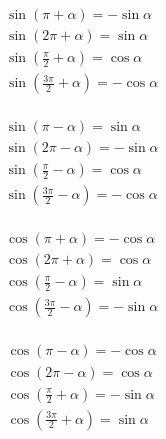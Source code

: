 \documentclass[a4paper, fleqn, fontset = mac]{ctexart}
\begin{document}
	\noindent
	\begin{minipage}{0.2\textwidth}
	\small
	\begin{align*}
		& \sin\left( \pi + \alpha \right) = -\sin\alpha \\
		& \sin\left( 2\pi + \alpha \right) = \sin\alpha \\
		& \sin\left( \frac\pi2 + \alpha \right) = \cos\alpha \\
		& \sin\left( \frac{3\pi}2 + \alpha \right) = -\cos\alpha \\
	\end{align*}
	
	\begin{align*}
		& \sin\left( \pi - \alpha \right) = \sin\alpha \\
		& \sin\left( 2\pi - \alpha \right) = -\sin\alpha \\
		& \sin\left( \frac\pi2 - \alpha \right) = \cos\alpha \\
		& \sin\left( \frac{3\pi}2 - \alpha \right) = -\cos\alpha \\
		\end{align*}
	\end{minipage}
	\begin{minipage}{0.2\textwidth}
	\small
	\begin{align*}
		& \cos\left( \pi + \alpha \right) = -\cos\alpha \\
		& \cos\left( 2\pi + \alpha \right) = \cos\alpha \\
		& \cos\left( \frac\pi2 - \alpha \right) = \sin\alpha \\
		& \cos\left( \frac{3\pi}2 - \alpha \right) = -\sin\alpha \\
	\end{align*}
	
	\begin{align*}
		& \cos\left( \pi - \alpha \right) = -\cos\alpha \\
		& \cos\left( 2\pi - \alpha \right) = \cos\alpha \\
		& \cos\left( \frac\pi2 + \alpha \right) = -\sin\alpha \\
		& \cos\left( \frac{3\pi}2 + \alpha \right) = \sin\alpha \\
	\end{align*}
	\end{minipage}
\end{document}
